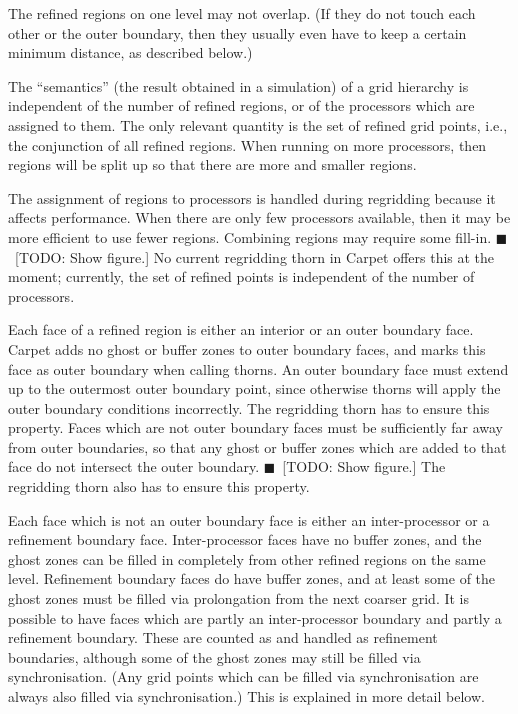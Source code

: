 \documentclass[oneside]{amsart}
\newcommand{\todo}[1]{{\color{blue}$\blacksquare$~\textsf{[TODO: #1]}}}
\begin{document}
The refined regions on one level may not overlap.  (If they do not
touch each other or the outer boundary, then they usually even have to
keep a certain minimum distance, as described below.)

The ``semantics'' (the result obtained in a simulation) of a grid
hierarchy is independent of the number of refined regions, or of the
processors which are assigned to them.  The only relevant quantity is
the set of refined grid points, i.e., the conjunction of all refined
regions.  When running on more processors, then regions will be split
up so that there are more and smaller regions.

The assignment of regions to processors is handled during regridding
because it affects performance.  When there are only few processors
available, then it may be more efficient to use fewer regions.
Combining regions may require some fill-in.  \todo{Show figure.}  No
current regridding thorn in Carpet offers this at the moment;
currently, the set of refined points is independent of the number of
processors.

Each face of a refined region is either an interior or an outer
boundary face.  Carpet adds no ghost or buffer zones to outer boundary
faces, and marks this face as outer boundary when calling thorns.  An
outer boundary face must extend up to the outermost outer boundary
point, since otherwise thorns will apply the outer boundary conditions
incorrectly.  The regridding thorn has to ensure this property.  Faces
which are not outer boundary faces must be sufficiently far away from
outer boundaries, so that any ghost or buffer zones which are added to
that face do not intersect the outer boundary.  \todo{Show figure.}
The regridding thorn also has to ensure this property.

Each face which is not an outer boundary face is either an
inter-processor or a refinement boundary face.  Inter-processor faces
have no buffer zones, and the ghost zones can be filled in completely
from other refined regions on the same level.  Refinement boundary
faces do have buffer zones, and at least some of the ghost zones must
be filled via prolongation from the next coarser grid.  It is possible
to have faces which are partly an inter-processor boundary and partly
a refinement boundary.  These are counted as and handled as refinement
boundaries, although some of the ghost zones may still be filled via
synchronisation.  (Any grid points which can be filled via
synchronisation are always also filled via synchronisation.)  This is
explained in more detail below.
\end{document}
